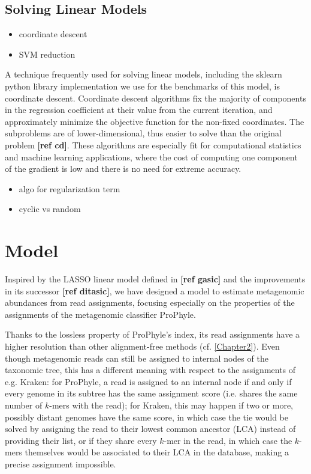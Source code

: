 \subsection{Solving Linear Models}
\begin{itemize}
    \item coordinate descent
    \item SVM reduction
\end{itemize}
A technique frequently used for solving linear models, including the sklearn python library implementation we use for the benchmarks of this model, is coordinate descent. Coordinate descent algorithms fix the majority of components in the regression coefficient at their value from the current iteration, and approximately minimize the objective function for the non-fixed coordinates. The subproblems are of lower-dimensional, thus easier to solve than the original problem \textbf{[ref cd]}. These algorithms are especially fit for computational statistics and machine learning applications, where the cost of computing one component of the gradient is low and there is no need for extreme accuracy.

\begin{itemize}
    \item algo for regularization term
    \item cyclic vs random
\end{itemize}

\section{Model}

Inspired by the LASSO linear model defined in \textbf{[ref gasic]} and the improvements in its successor \textbf{[ref ditasic]}, we have designed a model to estimate metagenomic abundances from read assignments, focusing especially on the properties of the assignments of the metagenomic classifier ProPhyle.

Thanks to the lossless property of ProPhyle's index, its read assignments have a higher resolution than other alignment-free methods (cf. \ref{Chapter2}). Even though metagenomic reads can still be assigned to internal nodes of the taxonomic tree, this has a different meaning with respect to the assignments of e.g. Kraken: for ProPhyle, a read is assigned to an internal node if and only if every genome in its subtree has the same assignment score (i.e. shares the same number of $k$-mers with the read); for Kraken, this may happen if two or more, possibly distant genomes have the same score, in which case the tie would be solved by assigning the read to their lowest common ancestor (LCA) instead of providing their list, or if they share every $k$-mer in the read, in which case the $k$-mers themselves would be associated to their LCA in the database, making a precise assignment impossible.

